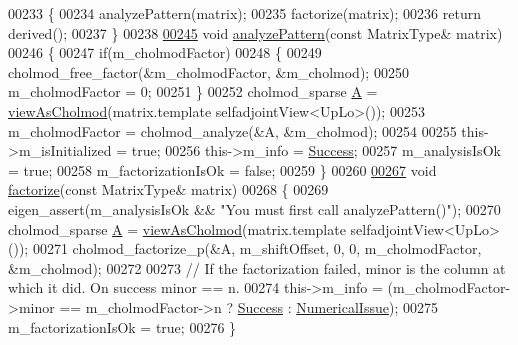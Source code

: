 \begin{DoxyCode}
00233     \{
00234       analyzePattern(matrix);
00235       factorize(matrix);
00236       \textcolor{keywordflow}{return} derived();
00237     \}
00238     
\hyperlink{class_eigen_1_1_cholmod_base_a5ac967e9f4ccfc43ca9e610b89232c24}{00245}     \textcolor{keywordtype}{void} \hyperlink{class_eigen_1_1_cholmod_base_a5ac967e9f4ccfc43ca9e610b89232c24}{analyzePattern}(\textcolor{keyword}{const} MatrixType& matrix)
00246     \{
00247       \textcolor{keywordflow}{if}(m\_cholmodFactor)
00248       \{
00249         cholmod\_free\_factor(&m\_cholmodFactor, &m\_cholmod);
00250         m\_cholmodFactor = 0;
00251       \}
00252       cholmod\_sparse \hyperlink{group___core___module_class_eigen_1_1_matrix}{A} = \hyperlink{namespace_eigen_ac9fb9e40cfc9ddbdc7da84ee01bb7545}{viewAsCholmod}(matrix.template selfadjointView<UpLo>());
00253       m\_cholmodFactor = cholmod\_analyze(&A, &m\_cholmod);
00254       
00255       this->m\_isInitialized = \textcolor{keyword}{true};
00256       this->m\_info = \hyperlink{group__enums_gga85fad7b87587764e5cf6b513a9e0ee5ea52581b035f4b59c203b8ff999ef5fcea}{Success};
00257       m\_analysisIsOk = \textcolor{keyword}{true};
00258       m\_factorizationIsOk = \textcolor{keyword}{false};
00259     \}
00260     
\hyperlink{class_eigen_1_1_cholmod_base_a5bd9c9ec4d1c15f202a6c66b5e9ef37b}{00267}     \textcolor{keywordtype}{void} \hyperlink{class_eigen_1_1_cholmod_base_a5bd9c9ec4d1c15f202a6c66b5e9ef37b}{factorize}(\textcolor{keyword}{const} MatrixType& matrix)
00268     \{
00269       eigen\_assert(m\_analysisIsOk && \textcolor{stringliteral}{"You must first call analyzePattern()"});
00270       cholmod\_sparse \hyperlink{group___core___module_class_eigen_1_1_matrix}{A} = \hyperlink{namespace_eigen_ac9fb9e40cfc9ddbdc7da84ee01bb7545}{viewAsCholmod}(matrix.template selfadjointView<UpLo>());
00271       cholmod\_factorize\_p(&A, m\_shiftOffset, 0, 0, m\_cholmodFactor, &m\_cholmod);
00272 
00273       \textcolor{comment}{// If the factorization failed, minor is the column at which it did. On success minor == n.}
00274       this->m\_info = (m\_cholmodFactor->minor == m\_cholmodFactor->n ? \hyperlink{group__enums_gga85fad7b87587764e5cf6b513a9e0ee5ea52581b035f4b59c203b8ff999ef5fcea}{Success} : 
      \hyperlink{group__enums_gga85fad7b87587764e5cf6b513a9e0ee5eaaf9b736d310a664e7729d163a035cc5f}{NumericalIssue});
00275       m\_factorizationIsOk = \textcolor{keyword}{true};
00276     \}

\end{DoxyCode}
